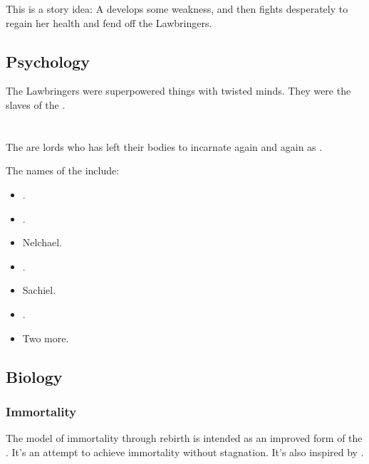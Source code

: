 This is a story idea:
A \resvil develops some weakness, and then fights desperately to regain her health and fend off the Lawbringers. 









\subsection{Psychology}
The Lawbringers were superpowered things with twisted minds. 
They were the slaves of the \banelords. 















\section{\Malachim}
The \Malachim{} are \resphan{} lords who has left their \resphan{} bodies to incarnate again and again as \humans{}. 

The names of the \Malachim{} include: 
\begin{itemize}
  \item {}.
  \item {}.
  \item Nelchael.
  \item {}.
  \item Sachiel.
  \item {}.
  \item Two more. 
\end{itemize}










\subsection{Biology}






\subsubsection{Immortality}
The \Malach{} model of immortality through rebirth is intended as an improved form of the . It's an attempt to achieve immortality without stagnation. It's also inspired by . 

